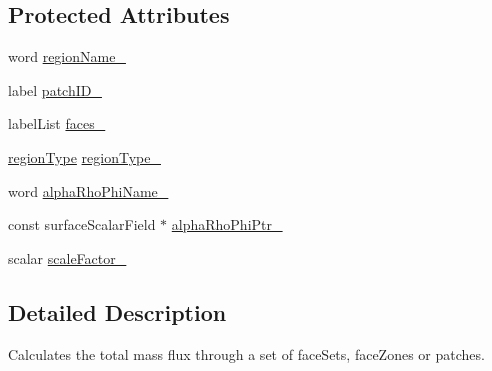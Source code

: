 \subsection*{Protected Attributes}
\begin{DoxyCompactItemize}
\item 
word \hyperlink{classFoam_1_1functionObjects_1_1massFlow_a34fba98d4cc7412f58c858b49f087393}{region\+Name\+\_\+}
\item 
label \hyperlink{classFoam_1_1functionObjects_1_1massFlow_abf52f9506022b39dbfcc5d4fe993a5df}{patch\+I\+D\+\_\+}
\item 
label\+List \hyperlink{classFoam_1_1functionObjects_1_1massFlow_a06fdd861cf7348a6cf4523679bcaee6e}{faces\+\_\+}
\item 
\hyperlink{classFoam_1_1functionObjects_1_1massFlow_a2c25b4a3d851e2d45d7a435a73598323}{region\+Type} \hyperlink{classFoam_1_1functionObjects_1_1massFlow_a09f356334695d93dbc1381b9534d95c3}{region\+Type\+\_\+}
\item 
word \hyperlink{classFoam_1_1functionObjects_1_1massFlow_a094f9c4501506b3aabb3d510fd8143af}{alpha\+Rho\+Phi\+Name\+\_\+}
\item 
const surface\+Scalar\+Field $\ast$ \hyperlink{classFoam_1_1functionObjects_1_1massFlow_a5f2ba6527b700c57790b8d0997b21159}{alpha\+Rho\+Phi\+Ptr\+\_\+}
\item 
scalar \hyperlink{classFoam_1_1functionObjects_1_1massFlow_a0da3932be8114c41f8456155d20d842f}{scale\+Factor\+\_\+}
\end{DoxyCompactItemize}


\subsection{Detailed Description}
Calculates the total mass flux through a set of face\+Sets, face\+Zones or patches. 

